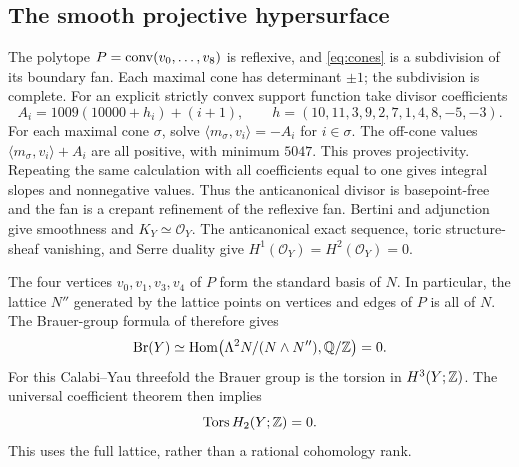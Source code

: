 \subsection{The smooth projective hypersurface}
The polytope $P=\operatorname{conv}(v_0,\ldots,v_8)$ is reflexive, and
\eqref{eq:cones} is a subdivision of its boundary fan. Each maximal
cone has determinant $\pm1$; the subdivision is complete.
For an explicit strictly convex support function take divisor
coefficients
\begin{equation}\label{eq:ample}
 A_i=1009(10000+h_i)+(i+1),\qquad
 h=(10,11,3,9,2,7,1,4,8,-5,-3).
\end{equation}
For each maximal cone $\sigma$, solve
$\langle m_\sigma,v_i\rangle=-A_i$ for $i\in\sigma$.
The off-cone values
$\langle m_\sigma,v_i\rangle+A_i$ are all positive, with minimum
$5047$. This proves projectivity. Repeating the same calculation
with all coefficients equal to one gives integral slopes and
nonnegative values. Thus the anticanonical divisor is basepoint-free
and the fan is a crepant refinement of the reflexive fan. Bertini
and adjunction give smoothness and $K_Y\simeq\mathcal O_Y$.
The anticanonical exact sequence, toric structure-sheaf vanishing,
and Serre duality give $H^1(\mathcal O_Y)=H^2(\mathcal O_Y)=0$.

The four vertices $v_0,v_1,v_3,v_4$ of $P$ form the standard
basis of $N$. In particular, the lattice $N''$ generated by the
lattice points on vertices and edges of $P$ is all of $N$.
The Brauer-group formula of \cite[Corollary 3.9]{BK} therefore gives
\[
 \operatorname{Br}(Y)
 \simeq\operatorname{Hom}\bigl(\Lambda^2N/(N\wedge N''),\mathbb Q/\mathbb Z\bigr)=0.
\]
For this Calabi--Yau threefold the Brauer group is the torsion in
$H^3(Y;\mathbb Z)$. The universal coefficient theorem then implies
\begin{equation}\label{eq:torsion}
 \operatorname{Tors}H_2(Y;\mathbb Z)=0.
\end{equation}
This uses the full lattice, rather than a rational cohomology rank.

